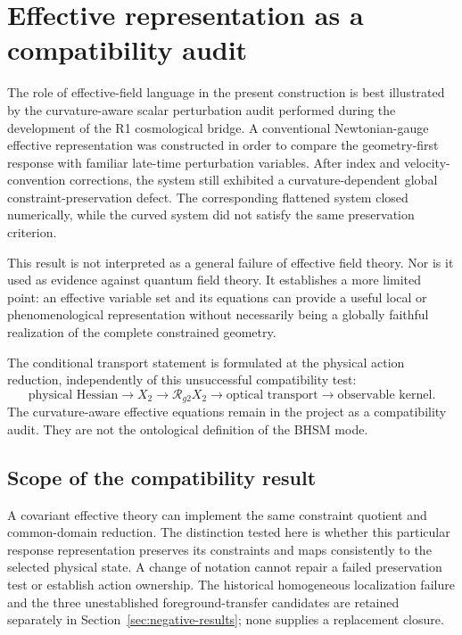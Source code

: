 \section{Effective representation as a compatibility audit}
\label{sec:effective-representation-audit}

The role of effective-field language in the present construction is best
illustrated by the curvature-aware scalar perturbation audit performed during
the development of the R1 cosmological bridge.  A conventional
Newtonian-gauge effective representation was constructed in order to compare
the geometry-first response with familiar late-time perturbation variables.
After index and velocity-convention corrections, the system still exhibited a
curvature-dependent global constraint-preservation defect.  The corresponding
flattened system closed numerically, while the curved system did not satisfy
the same preservation criterion.

This result is not interpreted as a general failure of effective field theory.
Nor is it used as evidence against quantum field theory.  It establishes a
more limited point: an effective variable set and its equations can provide a
useful local or phenomenological representation without necessarily being a
globally faithful realization of the complete constrained geometry.

The conditional transport statement is formulated at the physical action
reduction, independently of this unsuccessful compatibility test:
\begin{equation}
\boxed{
\text{physical Hessian}
\rightarrow
X_2
\rightarrow
\mathcal R_{g2}X_2
\rightarrow
\text{optical transport}
\rightarrow
\text{observable kernel}.
}
\end{equation}
The curvature-aware effective equations remain in the project as a
compatibility audit.  They are not the ontological definition of the BHSM
mode.

\subsection{Scope of the compatibility result}
A covariant effective theory can implement the same constraint quotient
and common-domain reduction. The distinction tested here is whether this
particular response representation preserves its constraints and maps
consistently to the selected physical state. A change of notation cannot
repair a failed preservation test or establish action ownership.
The historical homogeneous localization failure and the three unestablished
foreground-transfer candidates are retained separately in
Section~\ref{sec:negative-results}; none supplies a replacement closure.

